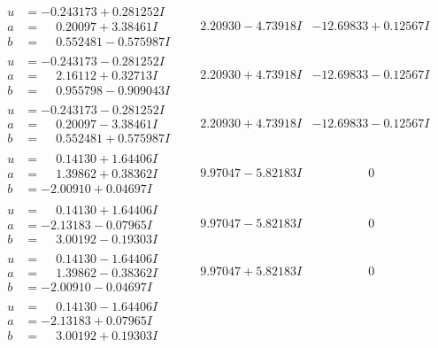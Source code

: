 \documentclass[1p]{elsarticle_modified}
\theoremstyle{definition}
\begin{document}
$$\begin{array}{c|c|c}
\begin{aligned}
u &= -0.243173 + 0.281252 I \\
a &= \phantom{-}0.20097 + 3.38461 I \\
b &= \phantom{-}0.552481 - 0.575987 I\end{aligned}
 & \phantom{-}2.20930 - 4.73918 I & -12.69833 + 0.12567 I \\ \hline\begin{aligned}
u &= -0.243173 - 0.281252 I \\
a &= \phantom{-}2.16112 + 0.32713 I \\
b &= \phantom{-}0.955798 - 0.909043 I\end{aligned}
 & \phantom{-}2.20930 + 4.73918 I & -12.69833 - 0.12567 I \\ \hline\begin{aligned}
u &= -0.243173 - 0.281252 I \\
a &= \phantom{-}0.20097 - 3.38461 I \\
b &= \phantom{-}0.552481 + 0.575987 I\end{aligned}
 & \phantom{-}2.20930 + 4.73918 I & -12.69833 - 0.12567 I \\ \hline\begin{aligned}
u &= \phantom{-}0.14130 + 1.64406 I \\
a &= \phantom{-}1.39862 + 0.38362 I \\
b &= -2.00910 + 0.04697 I\end{aligned}
 & \phantom{-}9.97047 - 5.82183 I & \phantom{-0.000000 } 0 \\ \hline\begin{aligned}
u &= \phantom{-}0.14130 + 1.64406 I \\
a &= -2.13183 - 0.07965 I \\
b &= \phantom{-}3.00192 - 0.19303 I\end{aligned}
 & \phantom{-}9.97047 - 5.82183 I & \phantom{-0.000000 } 0 \\ \hline\begin{aligned}
u &= \phantom{-}0.14130 - 1.64406 I \\
a &= \phantom{-}1.39862 - 0.38362 I \\
b &= -2.00910 - 0.04697 I\end{aligned}
 & \phantom{-}9.97047 + 5.82183 I & \phantom{-0.000000 } 0 \\ \hline\begin{aligned}
u &= \phantom{-}0.14130 - 1.64406 I \\
a &= -2.13183 + 0.07965 I \\
b &= \phantom{-}3.00192 + 0.19303 I\end{aligned}

\end{array}$$
\end{document}
